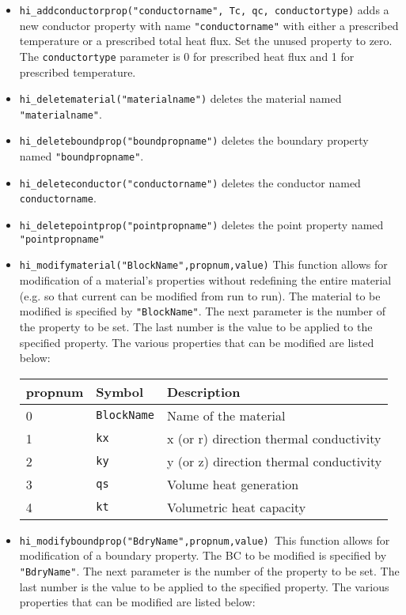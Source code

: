 \begin{itemize}
\item \texttt{hi\_addconductorprop("conductorname", Tc, qc, conductortype)} adds a new
conductor property with name \texttt{"conductorname"} with either a
prescribed temperature or a prescribed total heat flux. Set the unused
property to zero. The \texttt{conductortype} parameter is 0 for
prescribed heat flux and 1 for prescribed temperature.

\item \texttt{hi\_deletematerial("materialname")} deletes the material named
\texttt{"materialname"}.

\item \texttt{hi\_deleteboundprop("boundpropname")} deletes the boundary property
named \texttt{"boundpropname"}.

\item \texttt{hi\_deleteconductor("conductorname")} deletes the conductor named
\texttt{conductorname}.

\item \texttt{hi\_deletepointprop("pointpropname")} deletes the point property named
\texttt{"pointpropname"}

\item \texttt{hi\_modifymaterial("BlockName",propnum,value)} This function allows for
modification of a material's properties without redefining the
entire material (e.g. so that current can be modified from run to
run). The material to be modified is specified by
\texttt{"BlockName"}. The next parameter is the number of the
property to be set. The last number is the value to be applied to
the specified property. The various properties that can be modified
are listed below:

\begin{tabular}{lll}
propnum & Symbol &  Description \\ \hline
 0 & \texttt{BlockName} & Name of the material \\
 1 & \texttt{kx} & x (or r) direction thermal conductivity \\
 2 & \texttt{ky} & y (or z) direction thermal conductivity \\
 3 & \texttt{qs} & Volume heat generation \\
 4 & \texttt{kt} & Volumetric heat capacity
\end{tabular}


\item \texttt{hi\_modifyboundprop("BdryName",propnum,value) }This function allows for
modification of a boundary property. The BC to be modified is specified by
\texttt{"BdryName"}. The next parameter is the number of the property to be
set. The last number is the value to be applied to the specified property.
The various properties that can be modified are listed below:


\end{itemize}
